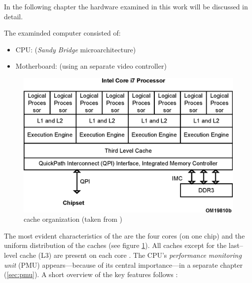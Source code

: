 \label{sec:technical-prerequisites}

In the following chapter the hardware examined in this work will be discussed in
detail.


\label{sec:hw-products}

The examinded computer consisted of:

\begin{itemize}

\item CPU: \JWPLcpu{} (\emph{San\-dy Bridge} microarchitecture)

\item Motherboard: \JWPLboard{} (using an separate video controller)

\end{itemize}


\label{sec:sandy-bridge}

\begin{figure}
  \centering
    \includegraphics[width=\textwidth]{fig/sandy-bridge-layout.eps}
  \caption{\JWPcpu{} cache organization (taken from \cite{intel2011softdev1})}
  \label{fig:cache-orga}
\end{figure}

The most evident characteristics of the \JWPcpu{} are the four cores (on one
chip) and the uniform distribution of the caches (see figure
\ref{fig:cache-orga}). All caches except for the last--level cache (L3) are
present on each core \cite{fog11}. The CPU's \emph{performance monitoring unit}
(PMU) appears---because of its central importance---in a separate chapter
(\ref{sec:pmu}). A short overview of the key features follows
\cite{intel2011spec}:

